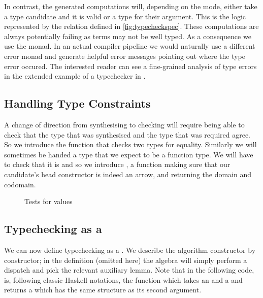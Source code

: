 In contrast, the generated computations will, depending on the mode,
either take a type candidate and  it is valid or 
a type for their argument. This is the logic represented by the 
relation defined in \cref{fig:typecheckspec}.
%
These computations are always potentially failing as terms may not be
well typed. As a consequence we use the  monad. In an actual
compiler pipeline we would naturally use a different error monad and
generate helpful error messages pointing out where the type error occured.
The interested reader can see a fine-grained analysis of type errors
in the extended example of a typechecker in
\citet{DBLP:journals/jfp/McBrideM04}.

\subsection{Handling Type Constraints}

A change of direction from synthesising to checking will require being
able to check that the type that was synthesised and the type that was
required agree. So we introduce the function  that checks
two types for equality.
%
Similarly we will sometimes be handed a type that we expect to be a
function type. We will have to check that it is and so we introduce
, a function making sure that our candidate's head
constructor is indeed an arrow, and returning the domain and codomain.

\begin{figure}[h]
\begin{minipage}[t]{0.45\textwidth}
\end{minipage}\hfill
\begin{minipage}[t]{0.45\textwidth}
\end{minipage}
\caption{Tests for  values}
\end{figure}

\subsection{Typechecking as a }

We can now define typechecking as a \semrec{}. We describe the
algorithm constructor by constructor; in the 
definition (omitted here) the algebra will simply perform a
dispatch and pick the relevant auxiliary lemma. Note that in the
following code, \AF{\_<\$\_} is, following classic Haskell notations,
the function which takes an  and a { } and
returns a { }
which has the same structure as its second argument.

